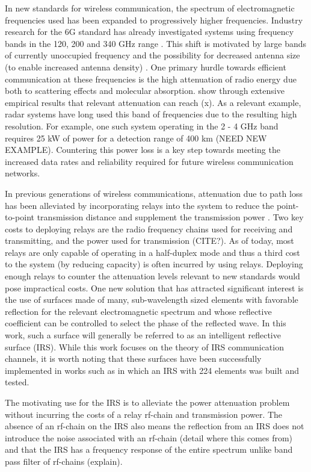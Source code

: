 In new standards for wireless communication, the spectrum of electromagnetic frequencies used has been expanded to progressively higher frequencies. Industry research for the 6G standard has already investigated systems using frequency bands in the 120, 200 and 340 GHz range \cite{Koziol}. This shift is motivated by large bands of currently unoccupied frequency and the possibility for decreased antenna size (to enable increased antenna density) \cite{akyildiz2018combating}. One primary hurdle towards efficient communication at these frequencies is the high attenuation of radio energy due both to scattering effects and molecular absorption. \cite{TODO} show through extensive empirical results that relevant attenuation can reach (x). 
As a relevant example, radar systems have long used this band of frequencies due to the resulting high resolution. For example, one such system operating in the 2 - 4 GHz band requires 25 kW of power for a detection range of 400 km \cite{TODO} (NEED NEW EXAMPLE). 
Countering this power loss is a key step towards meeting the increased data rates and reliability required for future wireless communication networks. 
\par
In previous generations of wireless communications, attenuation due to path loss has been alleviated by incorporating relays into the system to reduce the point-to-point transmission distance and supplement the transmission power \cite{dahlman20134g}. Two key costs to deploying relays are the radio frequency chains used for receiving and transmitting, and the power used for transmission (CITE?). As of today, most relays are only capable of operating in a half-duplex mode and thus a third cost to the system (by reducing capacity) is often incurred by using relays. Deploying enough relays to counter
the attenuation levels relevant to new standards would pose impractical costs. One new solution that has attracted significant interest is the use of surfaces made of many, sub-wavelength sized elements with favorable reflection for the relevant electromagnetic spectrum and whose reflective coefficient can be controlled to select the phase of the reflected wave. In this work, such a surface will generally be referred to as an intelligent reflective surface (IRS).
While this work focuses on the theory of IRS communication channels, it is worth noting that these surfaces have been successfully implemented in works such as \cite{tan2018enabling} in which an IRS with 224 elements was built and tested. 
\par
The motivating use for the IRS is to alleviate the power attenuation problem without incurring the costs of a relay rf-chain and transmission power. The absence of an rf-chain on the IRS also means the reflection from an IRS does not introduce the noise associated with an rf-chain (detail where this comes from) and that the IRS has a frequency response of the entire spectrum unlike band pass filter of rf-chains (explain).
